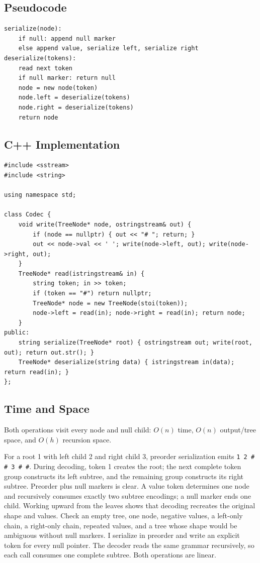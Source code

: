\subsection{Pseudocode}
\begin{lstlisting}[style=pseudocode]
serialize(node):
    if null: append null marker
    else append value, serialize left, serialize right
deserialize(tokens):
    read next token
    if null marker: return null
    node = new node(token)
    node.left = deserialize(tokens)
    node.right = deserialize(tokens)
    return node
\end{lstlisting}

\subsection{C++ Implementation}
\begin{lstlisting}[style=compactcode,caption={Complete C++ solution: Serialize and Deserialize Tree}]
#include <sstream>
#include <string>

using namespace std;

class Codec {
    void write(TreeNode* node, ostringstream& out) {
        if (node == nullptr) { out << "# "; return; }
        out << node->val << ' '; write(node->left, out); write(node->right, out);
    }
    TreeNode* read(istringstream& in) {
        string token; in >> token;
        if (token == "#") return nullptr;
        TreeNode* node = new TreeNode(stoi(token));
        node->left = read(in); node->right = read(in); return node;
    }
public:
    string serialize(TreeNode* root) { ostringstream out; write(root, out); return out.str(); }
    TreeNode* deserialize(string data) { istringstream in(data); return read(in); }
};
\end{lstlisting}

\subsection{Time and Space}
Both operations visit every node and null child: \(O(n)\) time, \(O(n)\)
output/tree space, and \(O(h)\) recursion space.

\lessonexpansion
  {For a root 1 with left child 2 and right child 3, preorder serialization
   emits \texttt{1 2 \# \# 3 \# \#}. During decoding, token 1 creates the
   root; the next complete token group constructs its left subtree, and the
   remaining group constructs its right subtree.}
  {Preorder plus null markers is clear. A value token determines one
   node and recursively consumes exactly two subtree encodings; a null marker
   ends one child. Working upward from the leaves shows that
   decoding recreates the original shape and values.}
  {Check an empty tree, one node, negative values, a left-only chain, a
   right-only chain, repeated values, and a tree whose shape would be ambiguous
   without null markers.}
  {I serialize in preorder and write an explicit token for every null pointer.
   The decoder reads the same grammar recursively, so each call consumes one
   complete subtree. Both operations are linear.}

